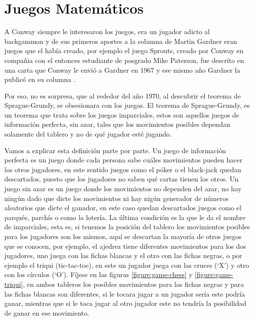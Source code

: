\section{Juegos Matem\'aticos}

A Conway siempre le interesaron los juegos, era un jugador adicto al backgammon y de sus primeros aportes a la columna de Martin Gardner eran juegos que el hab\'ia creado, por ejemplo el juego Sprouts, creado por Conway en compa\~nia con el entonces estudiante de posgrado Mike Paterson, fue descrito en una carta que Conway le envi\'o a Gardner en 1967 y ese mismo a\~no Gardner la public\'o en su columna \cite{}.

Por eso, no es sorpresa, que al rededor del a\~no 1970, al descubrir el teorema de Sprague-Grundy, se obsesionara con los juegos. El teorema de Sprague-Grundy\cite{}, es un teorema que trata sobre los juegos imparciales, estos son aquellos juegos de informaci\'on perfecta, sin azar, tales que los movimientos posibles dependan solamente del tablero y no de qu\'e jugador est\'e jugando.

Vamos a explicar esta definici\'on parte por parte. Un juego de informaci\'on perfecta es un juego donde cada persona sabe cu\'ales movimientos pueden hacer los otros jugadores, en este sentido juegos como el p\'oker o el black-jack quedan descartados, puesto que los jugadores no saben qu\'e cartas tienen los otros. Un juego sin azar es un juego donde los movimientos no dependen del azar, no hay ning\'un dado que dicte los movimientos ni hay nig\'un generador de n\'umeros aleatorios que dicte el ganador, en este caso quedan descartados juegos como el parqu\'es, parch\'is o como la loter\'ia. La \'ultima condici\'on es la que le da el nombre de imparciales, esta es, si tenemos la posici\'on del tablero los movimientos posibles para los jugadores son los mismos, aqu\'i se descartan la mayor\'ia de otros juegos que se conocen, por ejemplo, el ajedrez tiene diferentes movimientos para los dos jugadores, uno juega con las fichas blancas y el otro con las fichas negras, o por ejemplo el triqui (tic-tac-toe), en este un jugador juega con las cruces (`X') y otro con los c\'irculos (`O'). F\'ijese en las figuras \ref{figure:game-chess} y \ref{figure:game-triqui}, en ambos tableros los posibles movimientos para las fichas negras y para las fichas blancas son diferentes, si le tocara jugar a un jugador ser\'ia este podr\'ia ganar, mientras que si le toca jugar al otro jugador este no tendr\'ia la posibilidad de ganar en ese movimiento.

